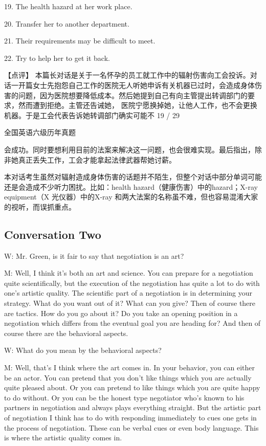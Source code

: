 \documentclass[UTF8,11pt]{ctexart}
\begin{document}
19. The health hazard at her work place.


20. Transfer her to another department.


21. Their requirements may be difficult to meet.


22. Try to help her to get it back.


【点评】 本篇长对话是关于一名怀孕的员工就工作中的辐射伤害向工会投诉。对话一开篇女士先抱怨自己工作的医院无人听她申诉有关机器已过时，会造成身体伤害的问题，因为医院想要降低成本。然后她提到自己有向主管提出转调部门的要求，然而遭到拒绝。主管还告诫她， 医院宁愿换掉她，让他人工作，也不会更换机器。于是工会代表告诉她转调部门确实可能不 19 / 29


全国英语六级历年真题


会成功。同时要想利用目前的法案来解决这一问题，也会很难实现。最后指出，除非她真正丢失工作，工会才能拿起法律武器帮她讨薪。


本对话考生虽然对辐射造成身体伤害的话题并不陌生，但整个对话中部分单词可能还是会造成不少听力困扰。比如：health hazard（健康伤害）中的hazard；X-ray equipment（X 光仪器）中的X-ray 和两大法案的名称虽不难，但也容易混淆大家的视听，而误抓重点。


\subsection*{Conversation Two}


W: Mr. Green, is it fair to say that negotiation is an art?


M: Well, I think it’s both an art and science. You can prepare for a negotiation quite scientifically, but the execution of the negotiation has quite a lot to do with one’s artistic quality. The scientific part of a negotiation is in determining your strategy. What do you want out of it? What can you give? Then of course there are tactics. How do you go about it? Do you take an opening position in a negotiation which differs from the eventual goal you are heading for? And then of course there are the behavioral aspects.


W: What do you mean by the behavioral aspects?


M: Well, that’s I think where the art comes in. In your behavior, you can either be an actor. You can pretend that you don’t like things which you are actually quite pleased about. Or you can pretend to like things which you are quite happy to do without. Or you can be the honest type negotiator who’s known to his partners in negotiation and always plays everything straight. But the artistic part of negotiation I think has to do with responding immediately to cues one gets in the process of negotiation. These can be verbal cues or even body language. This is where the artistic quality comes in.
\end{document}
